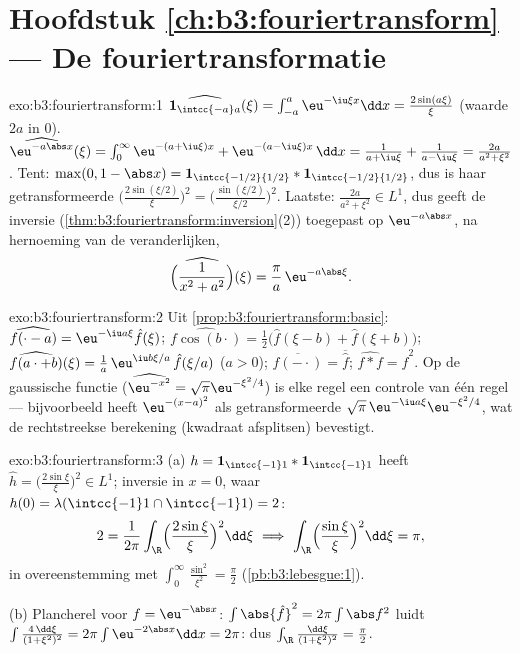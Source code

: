 \section*{Hoofdstuk \ref{ch:b3:fouriertransform} --- De
fouriertransformatie}

\begin{solution}{exo:b3:fouriertransform:1}
$\widehat{\mathbf 1_{\intcc{-a}a}}(\xi) =
\int_{-a}^a\eu^{-\iu\xi x}\dd x = \frac{2\sin(a\xi)}{\xi}$
(waarde $2a$ in $0$).
$\widehat{\eu^{-a\abs x}}(\xi) = \int_0^\infty\eu^{-(a +
\iu\xi)x} + \eu^{-(a - \iu\xi)x}\,\dd x = \frac1{a + \iu\xi} +
\frac1{a - \iu\xi} = \frac{2a}{a^2 + \xi^2}$.
Tent: $\max(0, 1 - \abs x) = \mathbf 1_{\intcc{-1/2}{1/2}} *
\mathbf 1_{\intcc{-1/2}{1/2}}$, dus is haar getransformeerde
$\bigl(\frac{2\sin(\xi/2)}\xi\bigr)^2 =
\bigl(\frac{\sin(\xi/2)}{\xi/2}\bigr)^2$.
Laatste: $\frac{2a}{a^2+\xi^2} \in L^1$, dus geeft de inversie
(\cref{thm:b3:fouriertransform:inversion}(2)) toegepast op
$\eu^{-a\abs x}$, na hernoeming van de veranderlijken,
\[
\widehat{\Bigl(\frac1{x^2 + a^2}\Bigr)}(\xi) =
\frac{\pi}{a}\,\eu^{-a\abs\xi} .
\]
\end{solution}

\begin{solution}{exo:b3:fouriertransform:2}
Uit \cref{prop:b3:fouriertransform:basic}:
$\widehat{f(\cdot - a)} = \eu^{-\iu a\xi}\hat f(\xi)$;
$\widehat{f\cos(b\cdot)} = \frac12\bigl(\hat f(\xi - b) + \hat
f(\xi + b)\bigr)$;
$\widehat{f(a\cdot + b)}(\xi) = \frac1a\,\eu^{\iu
b\xi/a}\,\hat f(\xi/a)$ ($a > 0$);
$\widehat{\overline{f(-\cdot)}} = \overline{\hat f}$;
$\widehat{f * f} = \hat f^2$. Op de gaussische functie
($\widehat{\eu^{-x^2}} = \sqrt\pi\eu^{-\xi^2/4}$) is elke regel
een controle van één regel --- bijvoorbeeld heeft
$\eu^{-(x-a)^2}$ als getransformeerde $\sqrt\pi\,\eu^{-\iu
a\xi}\eu^{-\xi^2/4}$, wat de rechtstreekse berekening (kwadraat
afsplitsen) bevestigt.
\end{solution}

\begin{solution}{exo:b3:fouriertransform:3}
(a) $h = \mathbf 1_{\intcc{-1}1}*\mathbf 1_{\intcc{-1}1}$ heeft
$\hat h = \bigl(\frac{2\sin\xi}\xi\bigr)^2 \in L^1$; inversie in
$x = 0$, waar $h(0) = \lambda(\intcc{-1}1\cap\intcc{-1}1) = 2$:
\[
2 = \frac1{2\pi}\int_\R\Bigl(\frac{2\sin\xi}\xi\Bigr)^2
\dd\xi
\ \Longrightarrow\
\int_\R\Bigl(\frac{\sin\xi}\xi\Bigr)^2\dd\xi = \pi ,
\]
in overeenstemming met $\int_0^\infty\frac{\sin^2}{\xi^2} =
\frac\pi2$ (\cref{pb:b3:lebesgue:1}).

(b) Plancherel voor $f = \eu^{-\abs x}$: $\int\abs{\hat f}^2 =
2\pi\int\abs f^2$ luidt $\int\frac{4\,\dd\xi}{(1 + \xi^2)^2} =
2\pi\int\eu^{-2\abs x}\dd x = 2\pi$: dus
$\int_\R\frac{\dd\xi}{(1+\xi^2)^2} = \frac\pi2$.
\end{solution}


